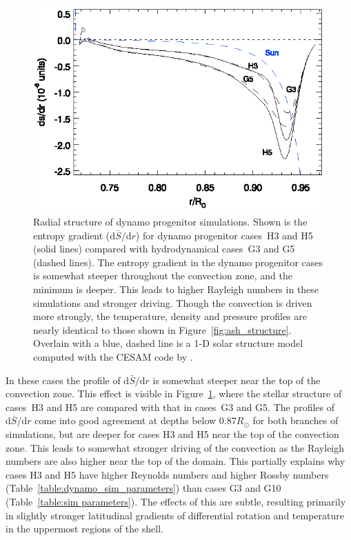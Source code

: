 \begin{figure}[!t]
  \begin{center}
    \includegraphics[width=0.75\linewidth]{figs/chapter_2/thesis_dynamo_ASH_structure.eps}
  \end{center}
  \caption[Radial structure of dynamo progenitor simulations]
	  {Radial structure of dynamo progenitor simulations.  
	  Shown is the entropy gradient ($\mathrm{d}\bar{S}/\mathrm{d}r$) for
	  dynamo progenitor cases~H3 and H5 (solid lines) 
	  compared with hydrodynamical cases~G3 and G5 (dashed lines).  
	  The entropy gradient in the dynamo progenitor cases is somewhat steeper
	  throughout the convection zone, and the minimum is deeper.
	  This leads to higher Rayleigh numbers in these simulations
	  and stronger driving.  Though the convection is driven more
	  strongly, the temperature, density and pressure profiles are
	  nearly identical to those shown in
	  Figure~\ref{fig:ash_structure}.  Overlain with a blue,
          dashed line is a 1-D solar structure model computed with the
          CESAM code by \cite{Brun_et_al_2002}.
	  \label{fig:ash_dynamo_structure}}
\end{figure}

In these cases the profile of $\mathrm{d}\bar{S}/\mathrm{d}r$ is
somewhat steeper near the top of the convection zone.  This effect is
visible in Figure~\ref{fig:ash_dynamo_structure}, where the stellar
structure of cases~H3 and H5 are compared with that in cases~G3 and
G5.  The profiles of $\mathrm{d}\bar{S}/\mathrm{d}r$ come into good
agreement at depths below $0.87 R_\odot$ for both branches of
simulations, but are deeper for cases H3 and H5 near the top of the
convection zone.  This leads to somewhat stronger driving of the
convection as the Rayleigh numbers are also higher near the top of the
domain.  This partially explains why cases H3 and H5 have higher
Reynolds numbers and higher Rossby numbers (Table~\ref{table:dynamo_sim_parameters})
than cases G3 and G10 (Table~\ref{table:sim parameters}).  The
effects of this are subtle, resulting primarily in slightly stronger
latitudinal gradients of differential rotation and temperature in the
uppermost regions of the shell.  

